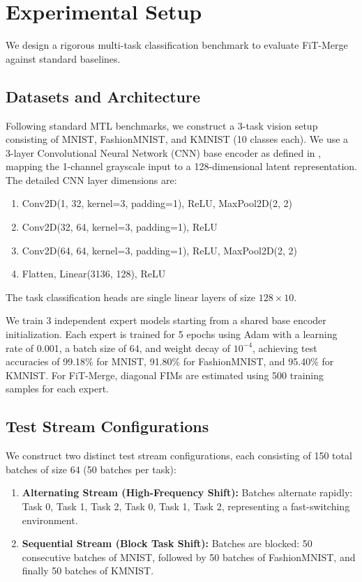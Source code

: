 \documentclass{article}
\theoremstyle{plain}
\theoremstyle{definition}
\theoremstyle{remark}
\begin{document}
\section{Experimental Setup}
\label{sec:setup}

We design a rigorous multi-task classification benchmark to evaluate FiT-Merge against standard baselines.

\subsection{Datasets and Architecture}
Following standard MTL benchmarks, we construct a 3-task vision setup consisting of MNIST, FashionMNIST, and KMNIST (10 classes each). 
We use a 3-layer Convolutional Neural Network (CNN) base encoder as defined in \cite{satasbf}, mapping the 1-channel grayscale input to a 128-dimensional latent representation. The detailed CNN layer dimensions are:
\begin{enumerate}
  \item Conv2D(1, 32, kernel=3, padding=1), ReLU, MaxPool2D(2, 2)
  \item Conv2D(32, 64, kernel=3, padding=1), ReLU
  \item Conv2D(64, 64, kernel=3, padding=1), ReLU, MaxPool2D(2, 2)
  \item Flatten, Linear(3136, 128), ReLU
\end{enumerate}
The task classification heads are single linear layers of size $128 \times 10$.

We train 3 independent expert models starting from a shared base encoder initialization. Each expert is trained for 5 epochs using Adam with a learning rate of 0.001, a batch size of 64, and weight decay of $10^{-4}$, achieving test accuracies of 99.18\% for MNIST, 91.80\% for FashionMNIST, and 95.40\% for KMNIST.
For FiT-Merge, diagonal FIMs are estimated using 500 training samples for each expert.

\subsection{Test Stream Configurations}
We construct two distinct test stream configurations, each consisting of 150 total batches of size 64 (50 batches per task):
\begin{enumerate}
  \item \textbf{Alternating Stream (High-Frequency Shift):} Batches alternate rapidly: Task 0, Task 1, Task 2, Task 0, Task 1, Task 2, representing a fast-switching environment.
  \item \textbf{Sequential Stream (Block Task Shift):} Batches are blocked: 50 consecutive batches of MNIST, followed by 50 batches of FashionMNIST, and finally 50 batches of KMNIST.
\end{enumerate}
\end{document}
